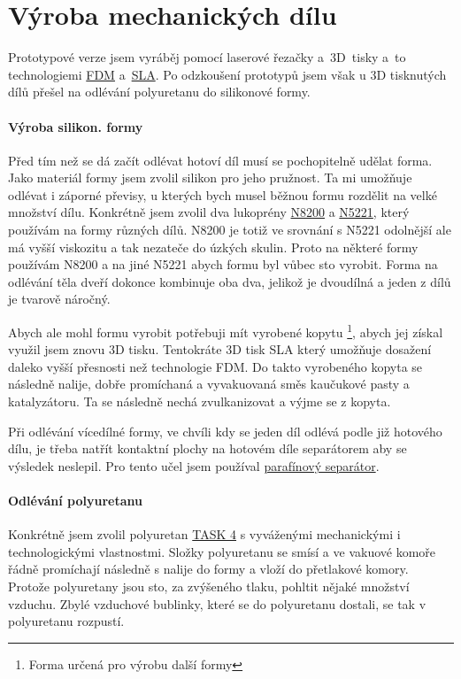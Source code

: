 \newpage
\section{Výroba mechanických dílu}
Prototypové verze jsem vyráběj pomocí laserové řezačky a~3D~tisky a~to technologiemi \href{https://www.3dhubs.com/guides/3d-printing/#fdm}{FDM} 
a~\href{https://www.3dhubs.com/guides/3d-printing/#sla-dlp}{SLA}. 
Po odzkoušení prototypů jsem však u 3D tisknutých dílů přešel na odlévání polyuretanu do silikonové formy. 

\paragraph*{Výroba silikon. formy}
Před tím než se dá začít odlévat hotoví díl musí se pochopitelně udělat forma. 
Jako materiál formy jsem zvolil silikon pro jeho pružnost. 
Ta mi umožňuje odlévat i záporné převisy, u kterých bych musel běžnou formu rozdělit na velké množství dílu.
Konkrétně jsem zvolil dva lukoprény \href{https://www.lucebni.cz/cs/lukopren-n/49-silikonovy-kaucuk-lukopren-n-8200.html}{N8200} 
a \href{https://www.lucebni.cz/cs/lukopren-n/43-silikonovy-kaucuk-lukopren-n-5221.html}{N5221}, který používám na formy různých dílů.
N8200 je totiž ve srovnání s N5221 odolnější ale má vyšší viskozitu a tak nezateče do úzkých skulin.
Proto na některé formy používám N8200 a na jiné N5221 abych formu byl vůbec sto vyrobit. 
Forma na odlévání těla dveří dokonce kombinuje oba dva, jelikož je dvoudílná a jeden z dílů je tvarově náročný.

Abych ale mohl formu vyrobit potřebuji mít vyrobené kopytu \footnote{Forma určená pro výrobu další formy}, abych jej získal využil jsem znovu 3D tisku.
Tentokráte 3D tisk SLA který umožňuje dosažení daleko vyšší přesnosti než technologie FDM. %
Do takto vyrobeného kopyta se následně nalije, dobře promíchaná a vyvakuovaná směs kaučukové pasty a katalyzátoru.
Ta se následně nechá zvulkanizovat a výjme se z kopyta.

Při odlévání vícedílné formy, ve chvíli kdy se jeden díl odlévá podle již hotového dílu, je třeba natřít kontaktní plochy na hotovém díle separátorem aby se výsledek neslepil.
Pro tento učel jsem používal \href{https://www.lucebni.cz/cs/pomocne-pripravky/54-lukopren-parafinovy-separator.html}{parafínový separátor}.

\paragraph*{Odlévání polyuretanu}
Konkrétně jsem zvolil polyuretan \href{https://www.smooth-on.com/tb/files/TASK_4_TB.pdf}{TASK 4} s vyváženými mechanickými i technologickými vlastnostmi.
Složky polyuretanu se smísí a ve vakuové komoře řádně promíchají následně s nalije do formy a vloží do přetlakové komory.
Protože polyuretany jsou sto, za zvýšeného tlaku, pohltit nějaké množství vzduchu.
Zbylé vzduchové bublinky, které se do polyuretanu dostali, se tak v polyuretanu rozpustí.